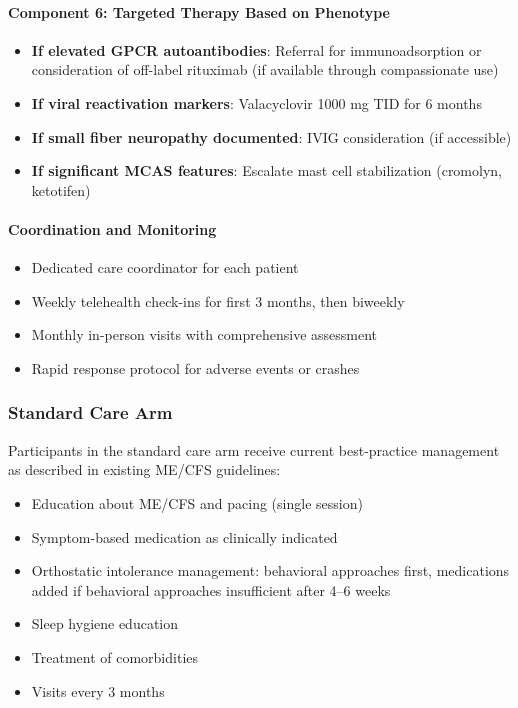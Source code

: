 \paragraph{Component 6: Targeted Therapy Based on Phenotype}
\begin{itemize}
    \item \textbf{If elevated GPCR autoantibodies}: Referral for immunoadsorption or consideration of off-label rituximab (if available through compassionate use)
    \item \textbf{If viral reactivation markers}: Valacyclovir 1000 mg TID for 6 months
    \item \textbf{If small fiber neuropathy documented}: IVIG consideration (if accessible)
    \item \textbf{If significant MCAS features}: Escalate mast cell stabilization (cromolyn, ketotifen)
\end{itemize}

\paragraph{Coordination and Monitoring}
\begin{itemize}
    \item Dedicated care coordinator for each patient
    \item Weekly telehealth check-ins for first 3 months, then biweekly
    \item Monthly in-person visits with comprehensive assessment
    \item Rapid response protocol for adverse events or crashes
\end{itemize}

\subsubsection{Standard Care Arm}

Participants in the standard care arm receive current best-practice management as described in existing ME/CFS guidelines:
\begin{itemize}
    \item Education about ME/CFS and pacing (single session)
    \item Symptom-based medication as clinically indicated
    \item Orthostatic intolerance management: behavioral approaches first, medications added if behavioral approaches insufficient after 4--6 weeks
    \item Sleep hygiene education
    \item Treatment of comorbidities
    \item Visits every 3 months
\end{itemize}

